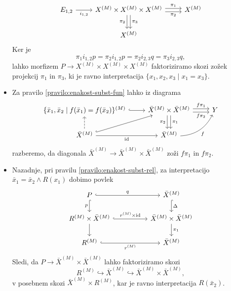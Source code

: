 \documentclass[../kategoricna_logika.tex]{subfiles}
\begin{document}
\begin{dokaz}
\begin{itemize}
\begin{equation*}
\begin{tikzcd}
        E_{1,2} \ar[r, "i_{1,2}"'] & X^{(M)} \times X^{(M)} \times
        X^{(M)} \ar[d, shift left, "\pi_3"] \ar[d, shift right,
        "\pi_2"'] \ar[r, shift left, "\pi_1"]
        \ar[r, shift right, "\pi_2"'] & X^{(M)} \\
        & X^{(M)}
      \end{tikzcd}
    \end{equation*}
    Ker je
    \[ \pi_1 i_{1,2}p = \pi_2 i_{1,2}p = \pi_2i_{2,3}q =
      \pi_3i_{2,3}q,\] lahko morfizem
    $P \to X^{(M)} \times X^{(M)} \times X^{(M)}$ faktoriziramo skozi
    zožek projekcij $\pi_1$ in $\pi_3$, ki je ravno interpretacija
    $\{x_1, x_2, x_3 \mid x_1 = x_3\}$.
  \item Za pravilo \ref{pravilo:enakost-subst-fun} lahko iz diagrama
    \begin{equation*}
      \begin{tikzcd}
        \{\bar{x}_1, \bar{x}_2 \mid f(\bar{x}_1) =
        f(\bar{x}_2)\}^{(M)} \ar[r, hook] & \bar{X}^{(M)} \times
        \bar{X}^{(M)} \ar[r, shift left, "f \pi_1"] \ar[r, shift
        right, "f \pi_2"']
        \ar[d, shift left, "\pi_1"] \ar[d, shift right, "\pi_2"'] & Y \\
        \bar{X}^{(M)} \ar[u, dashed] \ar[ur, hook] \ar[r, "
        \mathrm{id}"'] & \bar{X}^{(M)} \ar[ur, bend right, "f"']
      \end{tikzcd}
    \end{equation*}
    razberemo, da diagonala
    $\bar{X}^{(M)} \to \bar{X}^{(M)} \times \bar{X}^{(M)}$ zoži
    $f \pi_1$ in $f \pi_2$.
  \item Nazadnje, pri pravilu \ref{pravilo:enakost-subst-rel}, za
    interpretacijo $\bar{x}_1 = \bar{x}_2 \land R(x_1)$ dobimo povlek
    \begin{equation*}
      \begin{tikzcd}[column sep=5em]
        P \ar[d, hook, "p"'] \ar[r, hook, "q"] & \bar{X}^{(M)} \ar[d, hook, "\Delta"] \\
        R^{(M)} \times \bar{X}^{(M)} \ar[d] \ar[r, hook, "r^{(M)}
        \times \mathrm{id}"] &
        \bar{X}^{(M)} \times \bar{X}^{(M)} \ar[d, "\pi_1"] \\
        R^{(M)} \ar[r, hook, "r^{(M)}"'] & \bar{X}^{(M)}
      \end{tikzcd}
    \end{equation*}
    Sledi, da $P \to \bar{X}^{(M)} \times \bar{X}^{(M)}$ lahko
    faktoriziramo skozi
    \[R^{(M)} \hookrightarrow \bar{X}^{(M)} \hookrightarrow
      \bar{X}^{(M)} \times \bar{X}^{(M)},\] v posebnem skozi
    $\bar{X}^{(M)} \times R^{(M)}$, kar je ravno interpretacija
    $R(\bar{x}_2)$.
  \end{itemize}

\end{dokaz}
%
\end{document}

